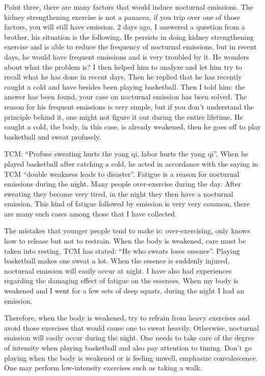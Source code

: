 \documentclass[
]{book}
\begin{document}
Point three, there are many factors that would induce nocturnal emissions. The kidney strengthening exercise is not a panacea, if you trip over one of those factors, you will still have emission. 2 days ago, I answered a question from a brother, his situation is the following. He persists in doing kidney strengthening exercise and is able to reduce the frequency of nocturnal emissions, but in recent days, he would have frequent emissions and is very troubled by it. He wonders about what the problem is? I then helped him to analyze and let him try to recall what he has done in recent days. Then he replied that he has recently caught a cold and have besides been playing basketball. Then I told him: the answer has been found, your case on nocturnal emission has been solved. The reason for his frequent emissions is very simple, but if you don't understand the principle behind it, one might not figure it out during the entire lifetime. He caught a cold, the body, in this case, is already weakened, then he goes off to play basketball and sweat profusely.

TCM: ``Profuse sweating hurts the yang qi, labor hurts the yang qi''. When he played basketball after catching a cold, he acted in accordance with the saying in TCM ``double weakness leads to disaster''. Fatigue is a reason for nocturnal emissions during the night. Many people over-exercise during the day. After sweating they become very tired, in the night they then have a nocturnal emission. This kind of fatigue followed by emission is very very common, there are many such cases among those that I have collected.

The mistakes that younger people tend to make is: over-exercising, only knows how to release but not to restrain. When the body is weakened, care must be taken into resting, TCM has stated: ``He who sweats loses essence''. Playing basketball makes one sweat a lot. When the essence is suddenly injured, nocturnal emission will easily occur at night. I have also had experiences regarding the damaging effect of fatigue on the essences. When my body is weakened and I went for a few sets of deep squats, during the night I had an emission.

Therefore, when the body is weakened, try to refrain from heavy exercises and avoid those exercises that would cause one to sweat heavily. Otherwise, nocturnal emission will easily occur during the night. One needs to take care of the degree of intensity when playing basketball and also pay attention to timing. Don't go playing when the body is weakened or is feeling unwell, emphasize convalescence. One may perform low-intensity exercises such as taking a walk.
\end{document}
